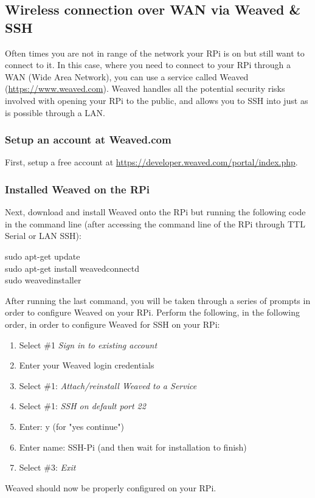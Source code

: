 \documentclass{article}
\newcommand*{\myfont}{\fontfamily{pcr}\selectfont}
\newcommand{\codeb}[2]{
  \begin{tcolorbox}[width=\textwidth,colback={SpringGreen},title={#1},colbacktitle=DarkGreen,coltitle=SpringGreen]
    \myfont
    #2
  \end{tcolorbox}
} %
\begin{document}
  \subsection{Wireless connection over WAN via Weaved \& SSH}
  \label{sec:connect-sshwan}
    Often times you are not in range of the network your RPi is on but still want to connect to it. In this case, where you need to connect to your RPi through a WAN (Wide Area Network), you can use a service called Weaved (\href{https://www.weaved.com}{https://www.weaved.com}). Weaved handles all the potential security risks involved with opening your RPi to the public, and allows you to SSH into just as is possible through a LAN.
    \subsubsection{Setup an account at Weaved.com}
    First, setup a free account at \href{https://developer.weaved.com/portal/index.php}{https://developer.weaved.com/portal/index.php}.
    \subsubsection{Installed Weaved on the RPi}
    Next, download and install Weaved onto the RPi but running the following code in the command line (after accessing the command line of the RPi through TTL Serial or LAN SSH):
    \codeb{Download and install Weaved to the RPi}
    {
      sudo apt-get update \\
      sudo apt-get install weavedconnectd \\
      sudo weavedinstaller \\
    }
    After running the last command, you will be taken through a series of prompts in order to configure Weaved on your RPi. Perform the following, in the following order, in order to configure Weaved for SSH on your RPi:
    \begin{enumerate}
      \item Select \#1 \textit{Sign in to existing account}
      \item Enter your Weaved login credentials
      \item Select \#1: \textit{Attach/reinstall Weaved to a Service}
      \item Select \#1: \textit{SSH on default port 22}
      \item Enter: y (for "yes continue")
      \item Enter name: SSH-Pi (and then wait for installation to finish)
      \item Select \#3: \textit{Exit}
    \end{enumerate}
    Weaved should now be properly configured on your RPi.
\end{document}
